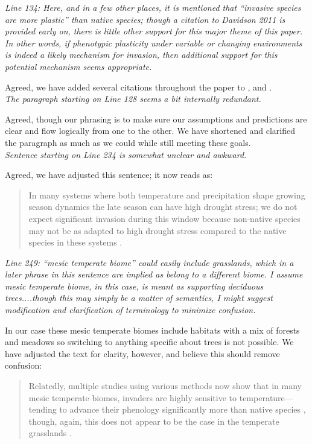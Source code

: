 \documentclass[11pt,a4paper]{letter}
\begin{document}
\begin{letter}{}
\emph{Line 134: Here, and in a few other places, it is mentioned that ``invasive species are more plastic'' than native species; though a citation to Davidson 2011 is provided early on, there is little other support for this major theme of this paper. In other words, if phenotypic plasticity under variable or changing environments is indeed a likely mechanism for invasion, then additional support for this potential mechanism seems appropriate.}

Agreed, we have added several citations throughout the paper to \citet{funk2008}, \citet{Hierro:2009up} and \citet{wainwright2013}.\\

\emph{The paragraph starting on Line 128 seems a bit internally redundant.}

Agreed, though our phrasing is to make sure our assumptions and predictions are clear and flow logically from one to the other. We have shortened and clarified the paragraph as much as we could while still meeting these goals.\\

\emph{Sentence starting on Line 234 is somewhat unclear and awkward.}

Agreed, we have adjusted this sentence; it now reads as:
\begin{quote} 
 In many systems where both temperature and precipitation shape growing season dynamics the late season can have high drought stress; we do not expect significant invasion during this window because non-native species may not be as adapted to high drought stress compared to the native species in these systems \citep{alpert2000}.
\end{quote}

\emph{Line 249: ``mesic temperate biome'' could easily include grasslands, which in a later phrase in this sentence are implied as belong to a different biome. I assume mesic temperate biome, in this case, is meant as supporting deciduous trees....though this may simply be a matter of semantics, I might suggest modification and clarification of terminology to minimize confusion.}

In our case these mesic temperate biomes include habitats with a mix of forests and meadows so switching to anything specific about trees is not possible. We have adjusted the text for clarity, however, and believe this should remove confusion:
\begin{quote}
Relatedly, multiple studies using various methods now show that in many mesic temperate biomes, invaders are highly sensitive to temperature---tending to advance their phenology significantly more than native species \citep{Willis:2010al,wolkovichAmBot2013}, though, again, this does not appear to be the case in the temperate grasslands \citep{wolkovichAmBot2013}.
\end{quote}


\end{letter}
\end{document}
